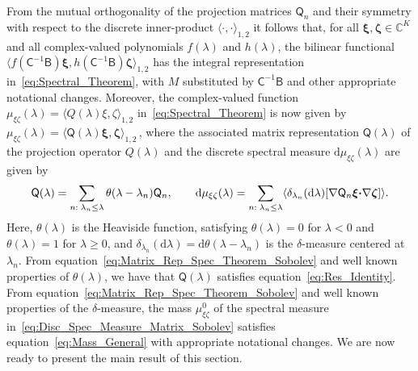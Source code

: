 \documentclass[english,12pt,jmp,graphicx]{revtex4-1}
\newcommand{\vecxi}{\boldsymbol{\xi}}
\newcommand{\veczeta}{\boldsymbol{\zeta}}
\newcommand{\bcdot}{\mbox{\boldmath${\cdot}$}}
\renewcommand{\d}{\mathrm{d}}
\newcommand{\Bm}{\mathsf{B}}
\newcommand{\Cm}{\mathsf{C}}
\newcommand{\Qm}{\mathsf{Q}}
\begin{document}
From the mutual orthogonality of
the projection matrices $\Qm_n$ and their symmetry with
respect to the discrete inner-product $\langle\cdot,\cdot\rangle_{1,2}$ it follows that, for
all $\vecxi,\veczeta\in\mathbb{C}^K$ and all complex-valued polynomials
$f(\lambda)$ and $h(\lambda)$, the bilinear functional $\langle
f(\Cm^{-1}\Bm)\vecxi,h(\Cm^{-1}\Bm)\veczeta\rangle_{1,2}$ has the
integral representation in~\eqref{eq:Spectral_Theorem}, with $M$
substituted by $\Cm^{-1}\Bm$ and other appropriate notational
changes. Moreover, the complex-valued function
$\mu_{\xi\zeta}(\lambda)=\langle
 Q(\lambda)\xi,\zeta\rangle_{1,2}$ in~\eqref{eq:Spectral_Theorem} is 
now given by
$\mu_{\xi\zeta}(\lambda)=\langle\Qm(\lambda)\vecxi,\veczeta\rangle_{1,2}\,$,
where the associated 
matrix representation $\Qm(\lambda)$ of the projection operator
$Q(\lambda)$ and the discrete spectral measure
$\d\mu_{\xi\zeta}(\lambda)$ are given by 
% 
\begin{align}\label{eq:Disc_Spec_Measure_Matrix_Sobolev}
  \Qm(\lambda)=\sum_{n:\;\lambda_n\leq\lambda}\theta(\lambda-\lambda_n)\Qm_n,
  \qquad
  \d\mu_{\xi\zeta}(\lambda)=\sum_{n:\;\lambda_n\leq \lambda}\langle\delta_{\lambda_n}(\d\lambda)[\nabla\Qm_n\vecxi\bcdot\nabla\veczeta]\rangle.
\end{align}
%
Here, $\theta(\lambda)$ is the Heaviside function, satisfying
$\theta(\lambda)=0$ for $\lambda<0$ and $\theta(\lambda)=1$ for
$\lambda\geq0$, and
$\delta_{\lambda_n}(\d\lambda)=\d\theta(\lambda-\lambda_n)$ is the
$\delta$-measure centered at $\lambda_n$.  From
equation~\eqref{eq:Matrix_Rep_Spec_Theorem_Sobolev} and well known
properties of $\theta(\lambda)$, we have that $\Qm(\lambda)$ satisfies
equation~\eqref{eq:Res_Identity}. From
equation~\eqref{eq:Matrix_Rep_Spec_Theorem_Sobolev} 
and well known properties of the $\delta$-measure, the mass
$\mu^0_{\xi\zeta}$ of the spectral measure
in~\eqref{eq:Disc_Spec_Measure_Matrix_Sobolev} satisfies
equation~\eqref{eq:Mass_General} with appropriate notational changes. 
We are now ready to present the main result of this section.
\end{document}
